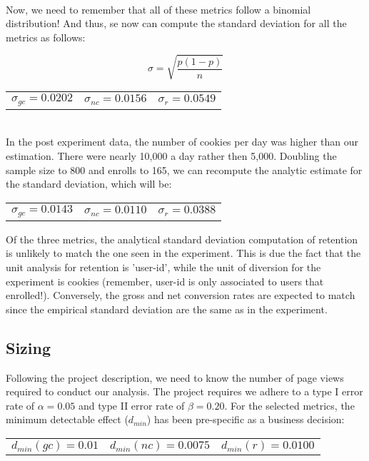 \documentclass[11pt]{article}
\begin{document}
		~\\
		Now, we need to remember that all of these metrics follow a binomial distribution!	
		And thus, se now can compute the standard deviation for all the metrics as follows:
		
		\begin{equation}
			\sigma = \sqrt{\frac{p(1-p)}{n}}
		\end{equation}
		
		\begin{tabular}{ccc}
			$\sigma_{gc} = 0.0202$ & $\sigma_{nc} = 0.0156$ & $\sigma_{r} = 0.0549$ \\
		\end{tabular}
		
		~\\
		In the post experiment data, the number of cookies per day was higher than our estimation.
		There were nearly 10,000 a day rather then 5,000.
		Doubling the sample size to 800 and enrolls to 165, we can recompute the analytic estimate for the standard deviation, which will be:
	
		\begin{tabular}{ccc}
			$\sigma_{gc} = 0.0143$ & $\sigma_{nc} = 0.0110$ & $\sigma_{r} = 0.0388$ \\
		\end{tabular}
		
		Of the three metrics, the analytical standard deviation computation of retention is unlikely to match the one seen in the experiment.
		This is due the fact that the unit analysis for retention is 'user-id', while the unit of diversion for the experiment is cookies (remember, user-id is only associated to users that enrolled!).
		Conversely, the gross and net conversion rates are expected to match since the empirical standard deviation are the same as in the experiment. 	
	
	\subsection{Sizing}
	
		Following the project description, we need to know the number of page views required to conduct our analysis.
		The project requires we adhere to a type I error rate of $\alpha=0.05$ and type II error rate of $\beta=0.20$.
		For the selected metrics, the minimum detectable effect ($d_{min}$) has been pre-specific as a business decision:
		
		\begin{tabular}{ccc}
			$d_{min}(gc) = 0.01$ & $d_{min}(nc) = 0.0075$ & $d_{min}(r) = 0.0100$ \\
		\end{tabular}
	
\end{document}
